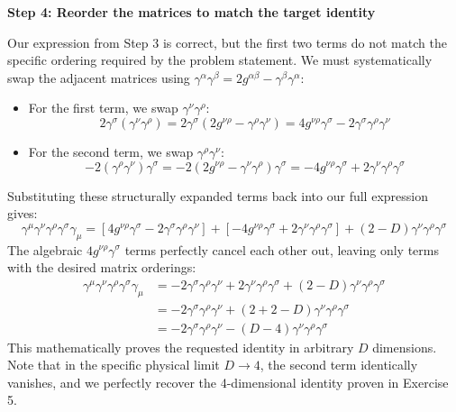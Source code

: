 \textbf{Step 4: Reorder the matrices to match the target identity}

Our expression from Step 3 is correct, but the first two terms do not match the specific ordering required by the problem statement. We must systematically swap the adjacent matrices using $\gamma^\alpha \gamma^\beta = 2g^{\alpha\beta} - \gamma^\beta \gamma^\alpha$:
\begin{itemize}
    \item For the first term, we swap $\gamma^\nu \gamma^\rho$:
          \[
              2\gamma^\sigma (\gamma^\nu \gamma^\rho) = 2\gamma^\sigma (2g^{\nu\rho} - \gamma^\rho \gamma^\nu) = 4g^{\nu\rho}\gamma^\sigma - 2\gamma^\sigma \gamma^\rho \gamma^\nu
          \]
    \item For the second term, we swap $\gamma^\rho \gamma^\nu$:
          \[
              -2(\gamma^\rho \gamma^\nu) \gamma^\sigma = -2(2g^{\nu\rho} - \gamma^\nu \gamma^\rho) \gamma^\sigma = -4g^{\nu\rho}\gamma^\sigma + 2\gamma^\nu \gamma^\rho \gamma^\sigma
          \]
\end{itemize}
Substituting these structurally expanded terms back into our full expression gives:
\[
    \gamma^\mu \gamma^\nu \gamma^\rho \gamma^\sigma \gamma_\mu = \left[ 4g^{\nu\rho}\gamma^\sigma - 2\gamma^\sigma \gamma^\rho \gamma^\nu \right] + \left[ -4g^{\nu\rho}\gamma^\sigma + 2\gamma^\nu \gamma^\rho \gamma^\sigma \right] + (2 - D)\gamma^\nu \gamma^\rho \gamma^\sigma
\]
The algebraic $4g^{\nu\rho}\gamma^\sigma$ terms perfectly cancel each other out, leaving only terms with the desired matrix orderings:
\[
    \begin{aligned}
        \gamma^\mu \gamma^\nu \gamma^\rho \gamma^\sigma \gamma_\mu & = - 2\gamma^\sigma \gamma^\rho \gamma^\nu + 2\gamma^\nu \gamma^\rho \gamma^\sigma + (2 - D)\gamma^\nu \gamma^\rho \gamma^\sigma \\
                                                                   & = -2\gamma^\sigma \gamma^\rho \gamma^\nu + \left( 2 + 2 - D \right) \gamma^\nu \gamma^\rho \gamma^\sigma                        \\
                                                                   & = -2\gamma^\sigma \gamma^\rho \gamma^\nu - (D - 4) \gamma^\nu \gamma^\rho \gamma^\sigma
    \end{aligned}
\]
This mathematically proves the requested identity in arbitrary $D$ dimensions. Note that in the specific physical limit $D \to 4$, the second term identically vanishes, and we perfectly recover the 4-dimensional identity proven in Exercise 5.


